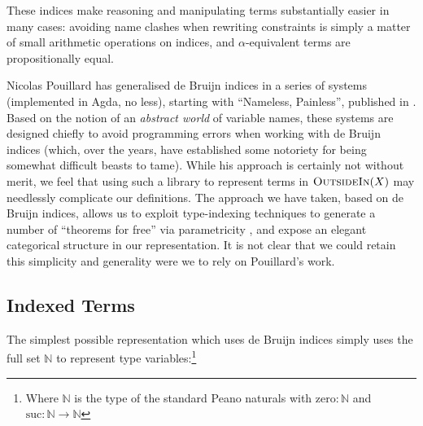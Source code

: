 \documentclass[a4paper]{jfp}
\newcommand{\outsidein}{\textsc{OutsideIn}(X)}
\begin{document}
These indices make reasoning and manipulating terms substantially easier in many cases: avoiding name clashes when rewriting constraints is simply a
matter of small arithmetic operations on indices, and $\alpha$-equivalent terms are propositionally equal.

Nicolas Pouillard has generalised de Bruijn indices in a series of systems (implemented in Agda, no less), starting with ``Nameless, Painless'',
published in \cite{Pouillard:2011hc}. Based on the notion of an \emph{abstract world} of variable names, these systems are designed chiefly to avoid
programming errors when working with de Bruijn indices (which, over the years, have established some notoriety for being somewhat difficult beasts to
tame). While his approach is certainly not without merit, we feel that using such a library to represent terms in $\outsidein$ may needlessly
complicate our definitions. The approach we have taken, based on de Bruijn indices, allows us to exploit type-indexing techniques to generate a number
of ``theorems for free'' via parametricity \cite{Wadler:1989vy}, and expose an elegant categorical structure in our representation. It is not clear
that we could retain this simplicity and generality were we to rely on Pouillard's work.

\pagebreak

\subsection{Indexed Terms}

The simplest possible representation which uses de Bruijn indices simply uses the full set $\mathbb{N}$ to represent type variables:\footnote{Where
   $\mathbb{N}$ is the type of the standard Peano naturals with $\text{zero} : \mathbb{N}$ and $\text{suc} : \mathbb{N} \rightarrow \mathbb{N}$}
\end{document}
